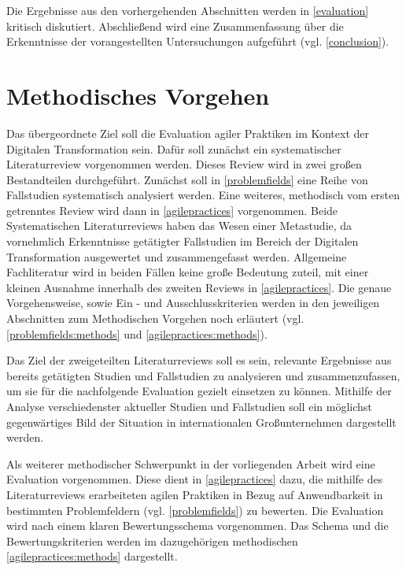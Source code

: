 Die Ergebnisse aus den vorhergehenden Abschnitten werden in \ref{evaluation} kritisch diskutiert. Abschließend wird eine Zusammenfassung über die Erkenntnisse der vorangestellten Untersuchungen aufgeführt (vgl. \ref{conclusion}).


\section{Methodisches Vorgehen}
\label{introduction:methods}


Das übergeordnete Ziel soll die Evaluation agiler Praktiken im Kontext der Digitalen Transformation sein. Dafür soll zunächst ein systematischer Literaturreview vorgenommen werden. Dieses Review wird in zwei großen Bestandteilen durchgeführt. Zunächst soll in \ref{problemfields} eine Reihe von Fallstudien systematisch analysiert werden. Eine weiteres, methodisch vom ersten getrenntes  Review wird dann in \ref{agilepractices} vorgenommen. Beide Systematischen Literaturreviews haben das Wesen einer Metastudie, da vornehmlich Erkenntnisse getätigter Fallstudien im Bereich der Digitalen Transformation ausgewertet und zusammengefasst werden. Allgemeine Fachliteratur wird in beiden Fällen keine große Bedeutung zuteil, mit einer kleinen Ausnahme innerhalb des zweiten Reviews in \ref{agilepractices}. Die genaue Vorgehensweise, sowie Ein - und Ausschlusskriterien werden in den jeweiligen Abschnitten zum Methodischen Vorgehen noch erläutert (vgl. \ref{problemfields:methods} und \ref{agilepractices:methods}).

Das Ziel der zweigeteilten Literaturreviews soll es sein, relevante Ergebnisse aus bereits getätigten Studien und Fallstudien zu analysieren und zusammenzufassen, um sie für die nachfolgende Evaluation gezielt einsetzen zu können. Mithilfe der Analyse verschiedenster aktueller Studien und Fallstudien soll ein möglichst gegenwärtiges Bild der Situation in internationalen Großunternehmen dargestellt werden.

Als weiterer methodischer Schwerpunkt in der vorliegenden Arbeit wird eine Evaluation vorgenommen. Diese dient in \ref{agilepractices} dazu, die mithilfe des Literaturreviews erarbeiteten agilen Praktiken in Bezug auf Anwendbarkeit in bestimmten Problemfeldern (vgl. \ref{problemfields}) zu bewerten. Die Evaluation wird nach einem klaren Bewertungsschema vorgenommen. Das Schema und die Bewertungskriterien werden im dazugehörigen methodischen \ref{agilepractices:methods} dargestellt.

